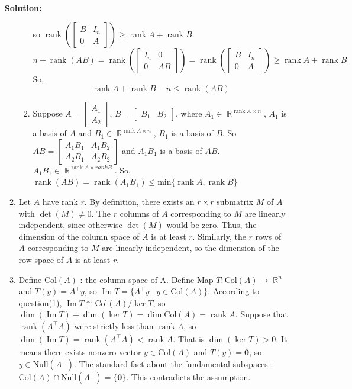 \documentclass{article}
\DeclareMathOperator{\rank}{\mathrm{rank}}
\DeclareMathOperator{\Ima}{\mathrm{Im}}
\DeclareMathOperator{\R}{\mathbb{R}}
\newenvironment{solution}{\color{blue} \smallskip \textbf{Solution:}}{}
\begin{document}
\begin{enumerate}
\begin{solution}
\begin{enumerate}
\begin{enumerate}
            so $\rank(\begin{bmatrix} B & I_n \\ 0 & A \end{bmatrix}) \geq \rank A + \rank B $.  
            $$ n + \rank(AB) = \rank(\begin{bmatrix} I_n & 0 \\ 0 & AB \end{bmatrix}) = \rank(\begin{bmatrix} B & I_n \\ 0 & A \end{bmatrix})\geq \rank A+\rank B $$
            So, $$ \rank A+\rank B - n \leq \rank (AB) $$
            \item
            Suppose $A=\begin{bmatrix}A_1\\A_2\end{bmatrix}$, $B=\begin{bmatrix}B_1 & B_2\end{bmatrix}$, where $A_1 \in \R^{\rank A \times n}$, $A_1$ is a basis of $A$ and $B_1 \in \R^{\rank A \times n}$, $B_1$ is a basis of $B$.
            So $AB=\begin{bmatrix}A_1B_1 & A_1B_2\\A_2B_1 & A_2B_2\end{bmatrix}$ and $A_1B_1$ is a basis of $AB$. $A_1B_1 \in \R^{\rank A \times rank B}$. So, $\rank(AB) = \rank(A_1B_1) \leq \text{min}\{\rank A, \rank B\}$
        \end{enumerate}  
        \item
        Let $A$ have rank $r$. By definition, there exists an $r \times r$ submatrix $M$ of $A$ with $\det(M) \neq 0$. The $r$ columns of $A$ corresponding to $M$ are linearly independent, since otherwise $\det(M)$ would be zero. Thus, the dimension of the column space of $A$ is at least $r$. Similarly, the $r$ rows of $A$ corresponding to $M$ are linearly independent, so the dimension of the row space of $A$ is at least $r$.
        \item 
        Define $\text{Col}(A)$ : the column space of A. \newline
        Define Map $T \colon \text{Col}(A) \to \R^n$ and $T(y) = A^\top y$, so $\Ima T = \{A^\top y \mid y \in \text{Col}(A)\}$. \newline
        According to question(1), \(\Ima T \cong \text{Col}(A) / \ker T\), so $\dim(\Ima T) + \dim(\ker T) = \dim \text{Col}(A) = \rank A$. \newline
        Suppose that $\rank (A^\top A)$ were strictly less than $\rank A$, so $\dim(\Ima T) = \rank (A^\top A) <  \rank A$. That is $\dim(\ker T) > 0$. It means there exists nonzero vector $y \in \text{Col}(A)$ and $T(y) = \mathbf{0}$, so $y \in \text{Null}(A^\top)$. The standard fact about the fundamental subspaces : $\text{Col}(A) \cap \text{Null}(A^\top) = \{\mathbf{0}\}$. This contradicts the assumption.

\end{enumerate}
\end{solution}
\end{enumerate}
\end{document}
